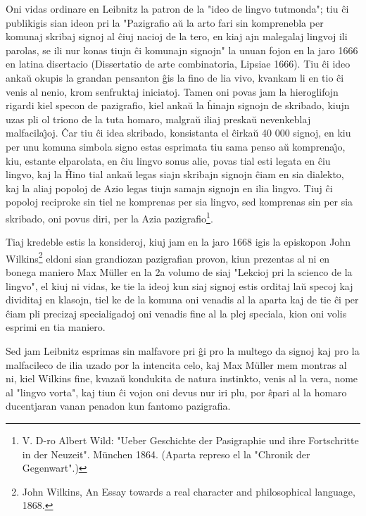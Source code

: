    Oni vidas ordinare en Leibnitz la patron de la "ideo de lingvo
tutmonda"; tiu \^ci publikigis sian ideon pri la "Pazigrafio a\u u
la arto fari sin komprenebla per komunaj skribaj signoj al \^ciuj
nacioj de la tero, en kiaj ajn malegalaj lingvoj ili parolas, se ili
nur konas tiujn \^ci komunajn signojn" la unuan fojon en la jaro
1666 en latina disertacio (Dissertatio de arte combinatoria, Lipsiae
1666). Tiu \^ci ideo anka\u u okupis la grandan pensanton \^gis la
fino de lia vivo, kvankam li en tio \^ci venis al nenio, krom
senfruktaj iniciatoj. Tamen oni povas jam la hieroglifojn rigardi
kiel specon de pazigrafio, kiel anka\u u la \^hinajn signojn de
skribado, kiujn uzas pli ol triono de la tuta homaro, malgra\u u
iliaj preska\u u nevenkeblaj malfacila\^{\j}oj. \^Car tiu \^ci idea
skribado, konsistanta el \^cirka\u u 40 000 signoj, en kiu per unu
komuna simbola signo estas esprimata tiu sama penso a\u u
komprena\^{\j}o, kiu, estante elparolata, en \^ciu lingvo sonus
alie, povas tial esti legata en \^ciu lingvo, kaj la \^Hino tial
anka\u u legas siajn skribajn signojn \^ciam en sia dialekto, kaj la
aliaj popoloj de Azio legas tiujn samajn signojn en ilia lingvo.
Tiuj \^ci popoloj reciproke sin tiel ne komprenas per sia lingvo,
sed komprenas sin per sia skribado, oni povus diri, per la Azia
pazigrafio\footnote{V. D-ro Albert Wild: "Ueber Geschichte der
Pasigraphie und ihre Fortschritte in der Neuzeit". München 1864.
(Aparta represo el la "Chronik der Gegenwart".)}.

   Tiaj kredeble estis la konsideroj, kiuj jam en la jaro 1668 igis la
episkopon John Wilkins\footnote{John Wilkins, An Essay towards a real character and
philosophical language, 1868.} eldoni sian grandiozan pazigrafian provon,
kiun prezentas al ni en bonega maniero Max Müller en la 2a volumo
de siaj "Lekcioj pri la scienco de la lingvo", el kiuj ni vidas,
ke tie la ideoj kun siaj signoj estis orditaj la\u u specoj kaj
dividitaj en klasojn, tiel ke de la komuna oni venadis al la aparta
kaj de tie \^ci per \^ciam pli precizaj specialigadoj oni venadis
fine al la plej speciala, kion oni volis esprimi en tia maniero.


   Sed jam Leibnitz esprimas sin malfavore pri \^gi pro la multego da
signoj kaj pro la malfacileco de ilia uzado por la intencita celo,
kaj Max Müller mem montras al ni, kiel Wilkins fine, kvaza\u u
kondukita de natura instinkto, venis al la vera, nome al "lingvo
vorta", kaj tiun \^ci vojon oni devus nur iri plu, por \^spari al
la homaro ducentjaran vanan penadon kun fantomo pazigrafia.


